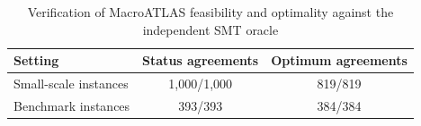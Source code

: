 \begin{table}[!htbp]
\caption{Verification of MacroATLAS feasibility and optimality against the independent SMT oracle}
\label{tab:oracle}
\centering
\begin{tabular}{@{}lcc@{}}
\toprule
Setting & Status agreements & Optimum agreements \\
\midrule
Small-scale instances & 1,000/1,000 & 819/819 \\
Benchmark instances & 393/393 & 384/384 \\
\bottomrule
\end{tabular}
\end{table}
